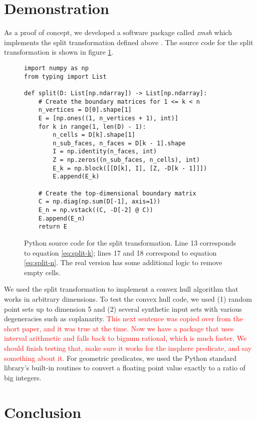 \documentclass[twocolumn]{article}
\begin{document}
\section{Demonstration}

As a proof of concept, we developed a software package called \emph{zmsh} which implements the split transformation defined above \cite{shapero2023zmsh}.
The source code for the split transformation is shown in figure \ref{fig:split-source-code}.
\begin{figure}
    \begin{verbatim}
import numpy as np
from typing import List

def split(D: List[np.ndarray]) -> List[np.ndarray]:
    # Create the boundary matrices for 1 <= k < n
    n_vertices = D[0].shape[1]
    E = [np.ones((1, n_vertices + 1), int)]
    for k in range(1, len(D) - 1):
        n_cells = D[k].shape[1]
        n_sub_faces, n_faces = D[k - 1].shape
        I = np.identity(n_faces, int)
        Z = np.zeros((n_sub_faces, n_cells), int)
        E_k = np.block([[D[k], I], [Z, -D[k - 1]]])
        E.append(E_k)

    # Create the top-dimensional boundary matrix
    C = np.diag(np.sum(D[-1], axis=1))
    E_n = np.vstack((C, -D[-2] @ C))
    E.append(E_n)
    return E
    \end{verbatim}
    \caption{Python source code for the split transformation.
    Line 13 corresponds to equation \eqref{eq:split-k}; lines 17 and 18 correspond to equation \eqref{eq:split-n}.
    The real version has some additional logic to remove empty cells.}
    \label{fig:split-source-code}
\end{figure}
We used the split transformation to implement a convex hull algorithm that works in arbitrary dimensions.
To test the convex hull code, we used (1) random point sets up to dimension 5 and (2) several synthetic input sets with various degeneracies such as coplanarity.
\textcolor{red}{This next sentence was copied over from the short paper, and it was true at the time.
Now we have a package that uses interval arithmetic and falls back to bignum rational, which is much faster.
We should finish testing that, make sure it works for the insphere predicate, and say something about it.}
For geometric predicates, we used the Python standard library's built-in routines to convert a floating point value exactly to a ratio of big integers.


\section{Conclusion}
\end{document}

